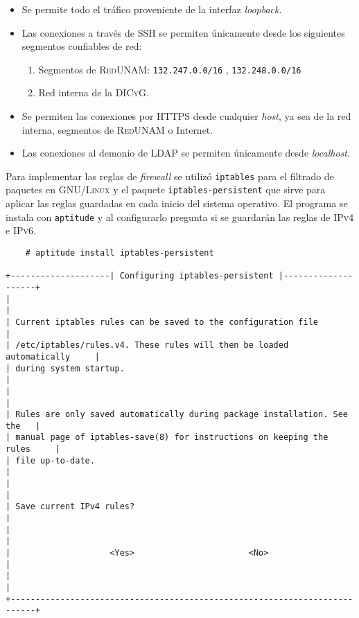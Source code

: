 \begin{itemize}
  \item Se permite todo el tr\'{a}fico proveniente de la interfaz \textit{loopback}.
  \item Las conexiones a trav\'{e}s de \textsc{SSH} se permiten \'{u}nicamente desde los siguientes segmentos confiables de red:
  \begin{enumerate}
    \item Segmentos de \textsc{RedUNAM}: \texttt{132.247.0.0/16} , \texttt{132.248.0.0/16}
    \item Red interna de la \textsc{DICyG}.
  \end{enumerate}
  \item Se permiten las conexiones por \textsc{HTTPS} desde cualquier \textit{host}, ya sea de la red interna, segmentos de \textsc{RedUNAM} o Internet.
  \item Las conexiones al demonio de \textsc{LDAP} se permiten \'{u}nicamente desde \textit{localhost}.
\end{itemize}

Para implementar las reglas de \textit{firewall} se utiliz\'{o} \texttt{iptables} para el filtrado de paquetes en \textsc{GNU/Linux} y el paquete \texttt{iptables-persistent} que sirve para aplicar las reglas guardadas en cada inicio del sistema operativo. El programa se instala con \texttt{aptitude} y al configurarlo pregunta si se guardar\'{a}n las reglas de \textsc{IPv4} e \textsc{IPv6}.

{
\scriptsize
\linespread{1}
\begin{verbatim}
    # aptitude install iptables-persistent

+--------------------| Configuring iptables-persistent |--------------------+
|                                                                           |
| Current iptables rules can be saved to the configuration file             |
| /etc/iptables/rules.v4. These rules will then be loaded automatically     |
| during system startup.                                                    |
|                                                                           |
| Rules are only saved automatically during package installation. See the   |
| manual page of iptables-save(8) for instructions on keeping the rules     |
| file up-to-date.                                                          |
|                                                                           |
| Save current IPv4 rules?                                                  |
|                                                                           |
|                    <Yes>                       <No>                       |
|                                                                           |
+---------------------------------------------------------------------------+
\end{verbatim}
}

